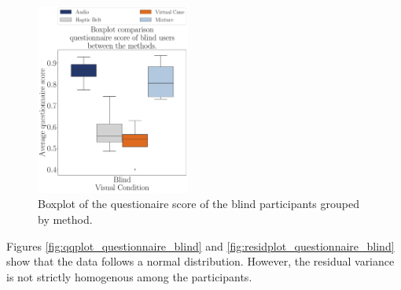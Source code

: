 \begin{figure}[!htb]
    \centering
    \includegraphics[width = 0.45\textwidth]{Resultados/Questionario/Figuras/pdf/boxplot_questionnaire_scene_blind.pdf}
    \caption{Boxplot of the questionaire score of the blind participants grouped by method.}
    \label{fig:boxplot_quest_blind_scene}
\end{figure}

%
%

Figures \ref{fig:qqplot_questionnaire_blind} and \ref{fig:residplot_questionnaire_blind} show that the data follows a normal distribution. However, the residual variance is not strictly homogenous among the participants. 

